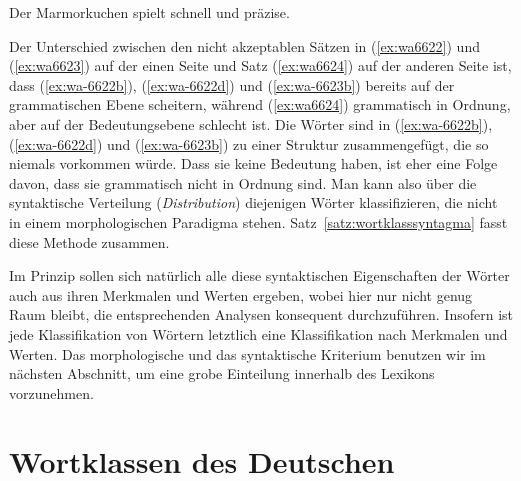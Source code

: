 \begin{exe}
  \ex\label{ex:wa6624}{Der Marmorkuchen spielt schnell und präzise.}
\end{exe}

Der Unterschied zwischen den nicht akzeptablen Sätzen in (\ref{ex:wa6622}) und (\ref{ex:wa6623}) auf der einen Seite und Satz (\ref{ex:wa6624}) auf der anderen Seite ist, dass (\ref{ex:wa-6622b}), (\ref{ex:wa-6622d}) und (\ref{ex:wa-6623b}) bereits auf der grammatischen Ebene scheitern, während (\ref{ex:wa6624}) grammatisch in Ordnung, aber auf der Bedeutungsebene schlecht ist.
Die Wörter sind in (\ref{ex:wa-6622b}), (\ref{ex:wa-6622d}) und (\ref{ex:wa-6623b}) zu einer Struktur zusammengefügt, die so niemals vorkommen würde.
Dass sie keine Bedeutung haben, ist eher eine Folge davon, dass sie grammatisch nicht in Ordnung sind.
Man kann also über die syntaktische Verteilung (\textit{Distribution}) diejenigen Wörter klassifizieren, die nicht in einem morphologischen Paradigma stehen.
Satz~\ref{satz:wortklasssyntagma} fasst diese Methode zusammen.


Im Prinzip sollen sich natürlich alle diese syntaktischen Eigenschaften der Wörter auch aus ihren Merkmalen und Werten ergeben, wobei hier nur nicht genug Raum bleibt, die entsprechenden Analysen konsequent durchzuführen.
Insofern ist jede Klassifikation von Wörtern letztlich eine Klassifikation nach Merkmalen und Werten.
Das morphologische und das syntaktische Kriterium benutzen wir im nächsten Abschnitt, um eine grobe Einteilung innerhalb des Lexikons vorzunehmen.




\section{Wortklassen des Deutschen}

